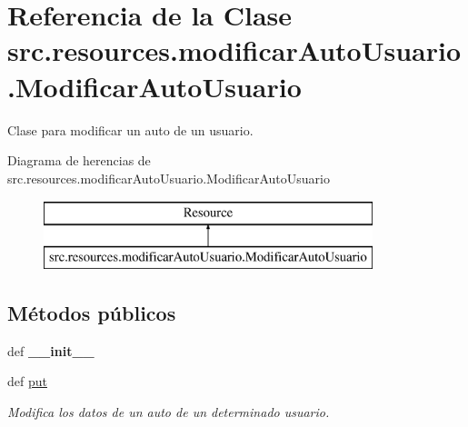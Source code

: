 \hypertarget{classsrc_1_1resources_1_1modificar_auto_usuario_1_1_modificar_auto_usuario}{\section{Referencia de la Clase src.\-resources.\-modificar\-Auto\-Usuario.\-Modificar\-Auto\-Usuario}
\label{classsrc_1_1resources_1_1modificar_auto_usuario_1_1_modificar_auto_usuario}
}


Clase para modificar un auto de un usuario.  


Diagrama de herencias de src.\-resources.\-modificar\-Auto\-Usuario.\-Modificar\-Auto\-Usuario\begin{figure}[H]
\begin{center}
\leavevmode
\includegraphics[height=2.000000cm]{classsrc_1_1resources_1_1modificar_auto_usuario_1_1_modificar_auto_usuario}
\end{center}
\end{figure}
\subsection*{Métodos públicos}
\begin{DoxyCompactItemize}
\item 
\hypertarget{classsrc_1_1resources_1_1modificar_auto_usuario_1_1_modificar_auto_usuario_a61c9a0026e46c161bf9b09dff39eb675}{def {\bfseries \-\_\-\-\_\-init\-\_\-\-\_\-}}\label{classsrc_1_1resources_1_1modificar_auto_usuario_1_1_modificar_auto_usuario_a61c9a0026e46c161bf9b09dff39eb675}

\item 
def \hyperlink{classsrc_1_1resources_1_1modificar_auto_usuario_1_1_modificar_auto_usuario_a600fa25d061c4fd53659bb3afea11c4a}{put}
\begin{DoxyCompactList}\small\item\em Modifica los datos de un auto de un determinado usuario. \end{DoxyCompactList}\end{DoxyCompactItemize}
